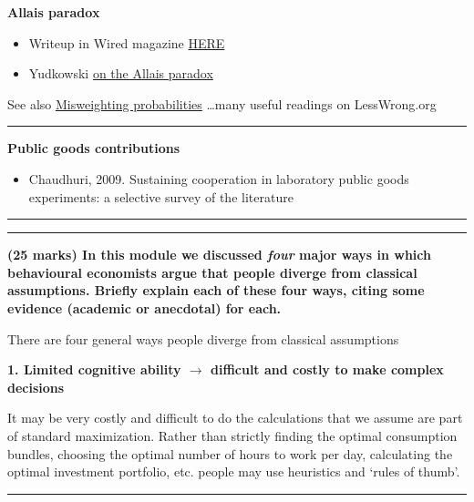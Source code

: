 \documentclass[]{article}
\providecommand{\tightlist}{%
  \setlength{\itemsep}{0pt}\setlength{\parskip}{0pt}}
\begin{document}
\textbf{Allais paradox}

\begin{itemize}
\item
  Writeup in Wired magazine
  \href{https://www.wired.com/2010/10/the-allais-paradox/}{HERE}
\item
  Yudkowski \href{http://lesswrong.com/lw/my/the_allais_paradox/}{on the
  Allais paradox}
\end{itemize}

See also
\href{http://lesswrong.com/lw/ml/but_theres_still_a_chance_right/}{Misweighting
probabilities} \ldots many useful readings on LessWrong.org

\begin{center}\rule{0.5\linewidth}{\linethickness}\end{center}

\textbf{Public goods contributions}

\begin{itemize}
\tightlist
\item
  Chaudhuri, 2009. Sustaining cooperation in laboratory public goods
  experiments: a selective survey of the literature
\end{itemize}

\begin{center}\rule{0.5\linewidth}{\linethickness}\end{center}

\begin{center}\rule{0.5\linewidth}{\linethickness}\end{center}

\textbf{(25 marks) In this module we discussed \textit{four} major ways
in which behavioural economists argue that people diverge from classical
assumptions. Briefly explain each of these four ways, citing some
evidence (academic or anecdotal) for each.}

There are four general ways people diverge from classical assumptions

\textbf{1. Limited cognitive ability \(\rightarrow\) difficult and
costly to make complex decisions}

It may be very costly and difficult to do the calculations that we
assume are part of standard maximization. Rather than strictly finding
the optimal consumption bundles, choosing the optimal number of hours to
work per day, calculating the optimal investment portfolio, etc. people
may use heuristics and `rules of thumb'.

\begin{center}\rule{0.5\linewidth}{\linethickness}\end{center}
\end{document}
